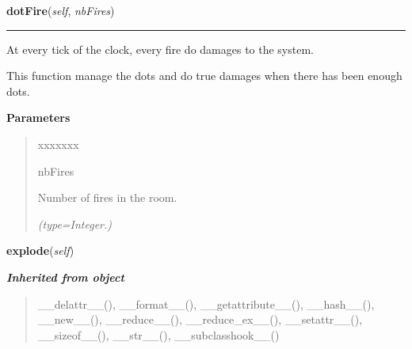 \hspace{.8\funcindent}\begin{boxedminipage}{\funcwidth}

    \raggedright \textbf{dotFire}(\textit{self}, \textit{nbFires})

    \vspace{-1.5ex}

    \rule{\textwidth}{0.5\fboxrule}
\setlength{\parskip}{2ex}
    At every tick of the clock, every fire do damages to the system.

    This function manage the dots and do true damages when there has been 
    enough dots.

\setlength{\parskip}{1ex}
      \textbf{Parameters}
      \vspace{-1ex}

      \begin{quote}
        \begin{Ventry}{xxxxxxx}

          \item[nbFires]

          Number of fires in the room.

            {\it (type=Integer.)}

        \end{Ventry}

      \end{quote}

    \end{boxedminipage}

    \label{systems:System:explode}

    \vspace{0.5ex}

\hspace{.8\funcindent}\begin{boxedminipage}{\funcwidth}

    \raggedright \textbf{explode}(\textit{self})

\setlength{\parskip}{2ex}
\setlength{\parskip}{1ex}
    \end{boxedminipage}


\large{\textbf{\textit{Inherited from object}}}

\begin{quote}
\_\_delattr\_\_(), \_\_format\_\_(), \_\_getattribute\_\_(), \_\_hash\_\_(), \_\_new\_\_(), \_\_reduce\_\_(), \_\_reduce\_ex\_\_(), \_\_setattr\_\_(), \_\_sizeof\_\_(), \_\_str\_\_(), \_\_subclasshook\_\_()
\end{quote}

